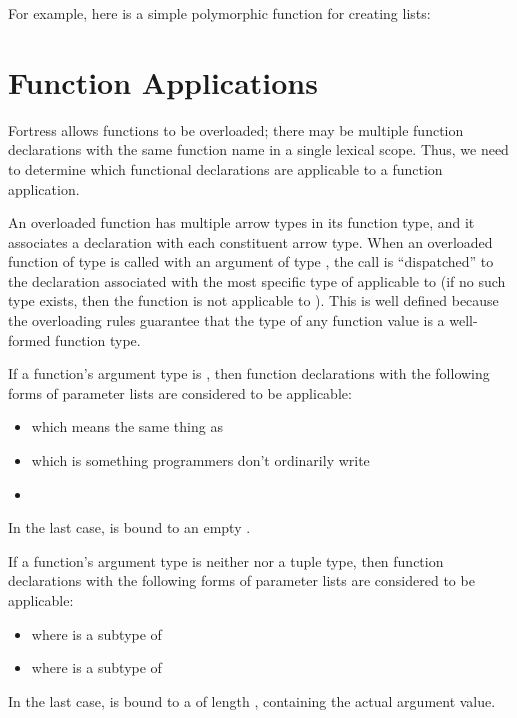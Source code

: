 For example, here is a simple
polymorphic function for creating lists:


\section{Function Applications}


Fortress allows functions to be overloaded; there may be multiple function
declarations with the same function name in a single lexical scope.
Thus, we need to determine which functional declarations are applicable to
a function application.

An overloaded function has multiple arrow types in its function type,
and it associates a declaration with each constituent arrow type.
When an overloaded function of type  is called with an argument of type
, the call is ``dispatched'' to the declaration associated with
the most specific type of  applicable to 
(if no such type exists, then the function is not applicable to ).
This is well defined because the overloading rules guarantee that
the type of any function value is a well-formed function type.

If a function's argument type is \EXP{()},
then function declarations with the following forms of parameter lists are
considered to be applicable:
\begin{itemize}
\item   \EXP{()}
which means the same thing as \EXP{(\_\COLONOP())}
\item   {}
which is something programmers don't ordinarily write
\item   {}
\end{itemize}
In the last case,  is bound to an empty
.

If a function's argument type  is
    neither \EXP{()} nor a tuple type, then function declarations with the following forms of parameter lists are considered
    to be applicable:
\begin{itemize}
\item
               where  is a subtype of 
\item
         where  is a subtype of 
\end{itemize}
In the last case,  is bound to a
     of length ,
    containing  the actual argument value.

